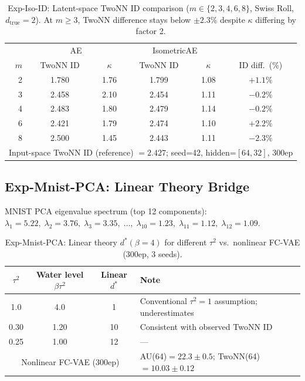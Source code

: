 \documentclass[make,article,submit,pdftex,moreauthors]{Definitions/mdpi}
\newcommand{\kap}{\kappa}
\begin{document}
\begin{table}[H]
\centering
\caption{Exp-Iso-ID: Latent-space TwoNN ID comparison ($m \in \{2,3,4,6,8\}$, Swiss Roll, $d_\mathrm{true}=2$). At $m \geq 3$, TwoNN difference stays below $\pm2.3\%$ despite $\kap$ differing by factor 2.}
\label{tab:iso_id}
\small
\begin{tabular}{r cc | cc | c}
\toprule
 & \multicolumn{2}{c|}{AE} & \multicolumn{2}{c|}{IsometricAE} & \\
$m$ & TwoNN ID & $\kap$ & TwoNN ID & $\kap$ & ID diff.\ (\%) \\
\midrule
2 & 1.780 & 1.76 & 1.799 & 1.08 & $+1.1\%$ \\
3 & 2.458 & 2.10 & 2.454 & 1.11 & $-0.2\%$ \\
4 & 2.483 & 1.80 & 2.479 & 1.14 & $-0.2\%$ \\
6 & 2.421 & 1.79 & 2.474 & 1.10 & $+2.2\%$ \\
8 & 2.500 & 1.45 & 2.443 & 1.11 & $-2.3\%$ \\
\midrule
\multicolumn{6}{l}{Input-space TwoNN ID (reference) $= 2.427$; seed=42, hidden=$[64,32]$, 300ep} \\
\bottomrule
\end{tabular}
\end{table}

\subsection*{Exp-Mnist-PCA: Linear Theory Bridge}

MNIST PCA eigenvalue spectrum (top 12 components):
$\lambda_1=5.22,\; \lambda_2=3.76,\; \lambda_3=3.35,\;\ldots,\;\lambda_{10}=1.23,\; \lambda_{11}=1.12,\; \lambda_{12}=1.09$.

\begin{table}[H]
\centering
\caption{Exp-Mnist-PCA: Linear theory $d^*(\beta=4)$ for different $\tau^2$ vs.\ nonlinear FC-VAE (300ep, 3 seeds).}
\label{tab:theory_pred}
\small
\begin{tabular}{ccc|l}
\toprule
$\tau^2$ & Water level $\beta\tau^2$ & Linear $d^*$ & Note \\
\midrule
1.0  & 4.0  & 1   & Conventional $\tau^2=1$ assumption; underestimates \\
0.30 & 1.20 & 10  & Consistent with observed TwoNN ID \\
0.25 & 1.00 & 12  & --- \\
\midrule
\multicolumn{3}{c|}{Nonlinear FC-VAE (300ep)} & AU(64)$=22.3\pm0.5$; TwoNN(64)$=10.03\pm0.12$ \\
\bottomrule
\end{tabular}
\end{table}
\end{document}
